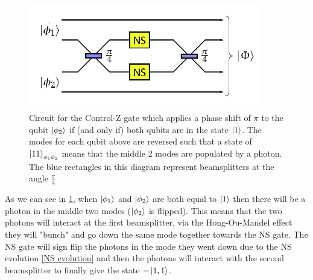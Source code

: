 \begin{figure}[h]
    \centering
    \includegraphics[width=0.9\textwidth]{images/CZ-gate.png}
    \caption{Circuit for the Control-Z gate which applies a phase shift of $\pi$ to the qubit $\ket{\phi_2}$ if (and only if) both qubits are in the state $\ket{1}$. The modes for each qubit above are reversed such that a state of $\ket{11}_{\phi_1\phi_2}$ means that the middle 2 modes are populated by a photon. The blue rectangles in this diagram represent beamsplitters at the angle $\frac{\pi}{4}$}\label{fig:CZ_gate}
\end{figure}

As we can see in \cref{fig:CZ_gate}, when $\ket{\phi_1}$ and $\ket{\phi_2}$ are both equal to $\ket{1}$ then there will be a photon in the middle two modes ($\ket{\phi_2}$ is flipped). This means that the two photons will interact at the first beamsplitter, via the Hong-Ou-Mandel effect they will "bunch" and go down the same mode together towards the NS gate. The NS gate will sign flip the photons in the mode they went down due to the NS evolution \cref{NS evolution} and then the photons will interact with the second beamsplitter to finally give the state $-\ket{1,1}$.%

